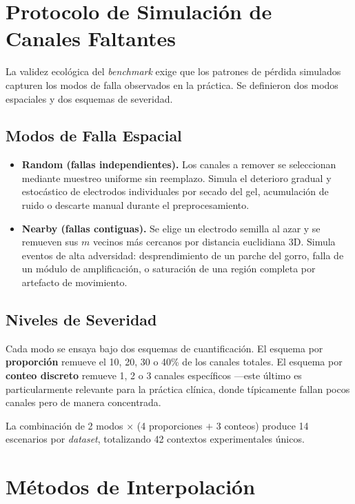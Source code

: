 \section{Protocolo de Simulación de Canales Faltantes}

La validez ecológica del \textit{benchmark} exige que los patrones de pérdida simulados capturen los modos de falla observados en la práctica. Se definieron dos modos espaciales y dos esquemas de severidad.

\subsection{Modos de Falla Espacial}

\begin{itemize}
    \item \textbf{Random (fallas independientes).} Los canales a remover se seleccionan mediante muestreo uniforme sin reemplazo. Simula el deterioro gradual y estocástico de electrodos individuales por secado del gel, acumulación de ruido o descarte manual durante el preprocesamiento.
    \item \textbf{Nearby (fallas contiguas).} Se elige un electrodo semilla al azar y se remueven sus $m$ vecinos más cercanos por distancia euclidiana 3D. Simula eventos de alta adversidad: desprendimiento de un parche del gorro, falla de un módulo de amplificación, o saturación de una región completa por artefacto de movimiento.
\end{itemize}

\subsection{Niveles de Severidad}

Cada modo se ensaya bajo dos esquemas de cuantificación. El esquema por \textbf{proporción} remueve el 10, 20, 30 o 40\% de los canales totales. El esquema por \textbf{conteo discreto} remueve 1, 2 o 3 canales específicos —este último es particularmente relevante para la práctica clínica, donde típicamente fallan pocos canales pero de manera concentrada.

La combinación de 2 modos $\times$ (4 proporciones $+$ 3 conteos) produce 14 escenarios por \textit{dataset}, totalizando 42 contextos experimentales únicos.

\section{Métodos de Interpolación}

